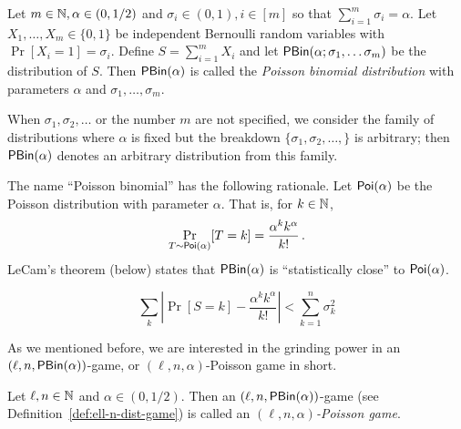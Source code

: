   \begin{definition}\label{def:poisson-binomial-distribution}
    Let $m \in \mathbb{N}, \alpha \in (0, 1/2)$ and 
    $\sigma_i \in (0, 1), i \in[m]$ so that $\sum_{i=1}^m \sigma_i = \alpha$.
    Let $X_1, \ldots, X_m \in \{0,1\}$ be independent Bernoulli random variables with 
    $\Pr[X_i = 1] = \sigma_i$. 
    Define $S = \sum_{i = 1}^m X_i$ 
    and let $\mathsf{PBin}(\alpha; \sigma_1, \ldots \sigma_m)$ be the distribution of $S$. 
    Then $\mathsf{PBin}(\alpha)$ is called the \emph{Poisson binomial distribution} 
    with parameters $\alpha$ and $\sigma_1, \ldots, \sigma_m$. 
    
    When $\sigma_1, \sigma_2, \ldots$ or the number $m$ are not specified, 
    we consider the family of distributions where $\alpha$ is fixed but the breakdown 
    $\{\sigma_1, \sigma_2, \ldots, \}$ is arbitrary; 
    then $\mathsf{PBin}(\alpha)$ denotes an arbitrary distribution 
    from this family.
  \end{definition}
  \noindent
  The name ``Poisson binomial'' has the following rationale. 
  Let $\mathsf{Poi}(\alpha)$ be the Poisson distribution with parameter $\alpha$.
  That is, for $k \in \mathbb{N}$, 
  $$
    \Pr_{T \sim \mathsf{Poi}(\alpha)}[T = k] = \frac{\alpha^k k^\alpha}{k!}\,.
  $$
  LeCam's theorem (below) states that $\mathsf{PBin}(\alpha)$ is ``statistically close'' to $\mathsf{Poi}(\alpha)$.
  \begin{theorem*}[LeCam 1960]
  $$
    \sum_k \left\vert \Pr[S = k] - \frac{\alpha^k k^\alpha}{k!} \right\vert < \sum_{k=1}^n \sigma_k^2
  $$
  \end{theorem*}

  As we mentioned before, 
  we are interested in the grinding power in an $(\ell, n, \mathsf{PBin}(\alpha))$-game, 
  or $(\ell, n, \alpha)$-Poisson game in short. 
  

  \begin{definition}\label{def:xor-game-poisson}
      Let $\ell, n \in \mathbb{N}$ and $\alpha \in (0, 1/2)$.
      Then an $(\ell, n, \mathsf{PBin}(\alpha) )$-game (see Definition~\ref{def:ell-n-dist-game})
      is called an 
      \emph{$(\ell, n, \alpha)$-Poisson game}.
  \end{definition}



